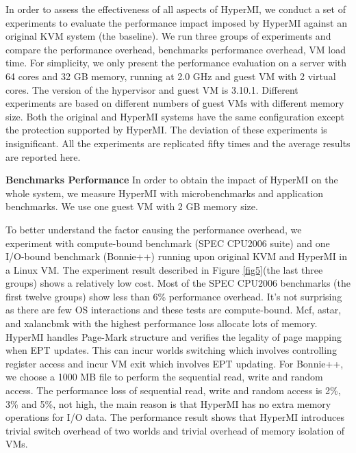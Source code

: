 \documentclass[conference]{IEEEtran}
\begin{document}
In order to assess the effectiveness of all aspects of HyperMI, we conduct a set of experiments to evaluate the performance impact imposed by HyperMI against an original KVM system (the baseline). We run three groups of experiments and compare the performance overhead, benchmarks performance overhead, VM load time.
For simplicity, we only present the performance evaluation on a server with 64 cores and 32 GB memory, running at 2.0 GHz and guest VM with 2 virtual cores. The version of the hypervisor and guest VM is 3.10.1. Different experiments are based on different numbers of guest VMs with different memory size. Both the original and HyperMI systems have the same configuration except the protection supported by HyperMI. The deviation of these experiments is insignificant. All the experiments are replicated fifty times and the average results are reported here.



\textbf{Benchmarks Performance}
In order to obtain the impact of HyperMI on the whole system, we measure HyperMI with microbenchmarks and application benchmarks. 
We use one guest VM with 2 GB memory size. 

To better understand the factor causing the performance overhead, we experiment with compute-bound benchmark (SPEC CPU2006 suite) and one I/O-bound benchmark (Bonnie++) running upon original KVM and HyperMI in a Linux VM. The experiment result described in Figure \ref{fig5}(the last three groups) shows a relatively low cost. Most of the SPEC CPU2006 benchmarks (the first twelve groups) show less than 6\% performance overhead. It's not surprising as there are few OS interactions and these tests are compute-bound. Mcf, astar, and xalancbmk with the highest performance loss allocate lots of memory. HyperMI handles Page-Mark structure and verifies the legality of page mapping when EPT updates. This can incur worlds switching which involves controlling register access and incur VM exit which involves EPT updating.
 For Bonnie++, we choose a 1000 MB file to perform the sequential read, write and random access. The performance loss of sequential read, write and random access is 2\%, 3\% and 5\%, not high, the main reason is that HyperMI has no extra memory operations for I/O data. The performance result shows that HyperMI introduces trivial switch overhead of two worlds and trivial overhead of memory isolation of VMs.
\end{document}
